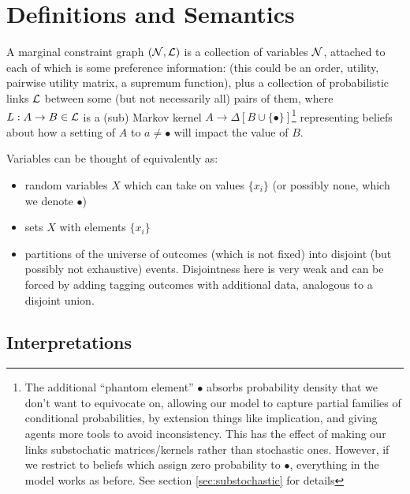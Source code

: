 \documentclass{article}
\begin{document}
	\section{Definitions and Semantics}
	\begin{defn*}\label{def:pcg-semiformal}
		A marginal constraint graph $(\cal N, L)$ is a collection of variables $\cal N$, attached to each of which is some preference information: (this could be an order, utility, pairwise utility matrix, a supremum function), plus a collection of probabilistic links $\cal L$ between some (but not necessarily all) pairs of them, where $L: A\to B \in \cal L$ is a (sub) Markov kernel $A \to \Delta [B \cup \{\bullet\}]$\footnote{The additional ``phantom element'' $\bullet$ absorbs probability density that we don't want to equivocate on, allowing our model to capture partial families of conditional probabilities, by extension things like implication, and giving agents more tools to avoid inconsistency. This has the effect of making our links substochatic matrices/kernels rather than stochastic ones. However, if we restrict to beliefs which assign zero probability to $\bullet$, everything in the model works as before. See section \ref{sec:substochastic} for details} representing beliefs about how a setting of $A$ to $a \neq \bullet$ will impact the value of $B$. 
	\end{defn*}
	
	Variables can be thought of equivalently as:
	\begin{itemize}[nosep]
		\item random variables $X$ which can take on values $\{x_i\}$ (or possibly none, which we denote $\bullet$)
		\item sets $X$ with elements $\{x_i\}$
		\item partitions of the universe of outcomes (which is not fixed) into disjoint (but possibly not exhaustive) events. Disjointness here is very weak and can be forced by adding tagging outcomes with additional data, analogous to a disjoint union.
	\end{itemize}
	
	
	\subsection{Interpretations}
	
\end{document}
